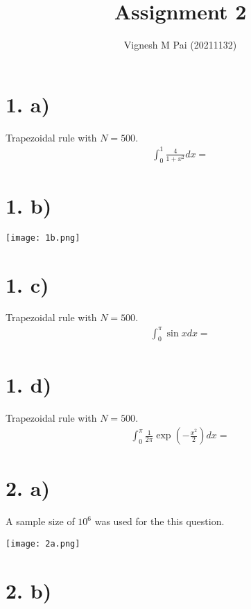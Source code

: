 \documentclass{article}
\title{Assignment 2}
\author{Vignesh M Pai (20211132)}
\date{}
\begin{document}
\maketitle

\section*{1. a)}

Trapezoidal rule with $N = 500$.
\begin{align*}
    \int_0^1 \frac{4}{1 + x^2} dx = 
\end{align*}

\section*{1. b)}

\begin{center}
    \texttt{[image: 1b.png]}
\end{center}

\section*{1. c)}

Trapezoidal rule with $N = 500$.
\begin{align*}
    \int_0^\pi \sin x dx = 
\end{align*}

\section*{1. d)}

Trapezoidal rule with $N = 500$.
\begin{align*}
    \int_0^\pi \frac{1}{2\pi} \exp\left(-\frac{x^2}{2}\right) dx = 
\end{align*}

\section*{2. a)}

A sample size of $10^6$ was used for the this question.
\begin{center}
    \texttt{[image: 2a.png]}
\end{center}

\section*{2. b)}
\end{document}
